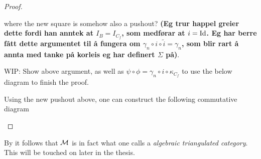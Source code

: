 \begin{proof}
\begin{enumerate}[label={(\bfseries TR\arabic*)}]
{            %

            where the new square is somehow also a pushout? {\bf (Eg trur happel greier dette fordi han anntek at \( I_B = I_{C_f} \), som medførar at \( i = \operatorname{Id} \). Eg har berre fått dette argumentet til å fungera om \( \gamma_n \circ i \circ \tilde{i} = \gamma_n \), som blir rart å annta med tanke på korleis eg har definert \( \Sigma \) på)}.

            WIP: Show above argument, as well as \( \psi \circ \phi = \gamma_n \circ i \circ \kappa_{C_f} \) to use the below diagram to finish the proof.

            Using the new pushout above, one can construct the following commutative diagram
            \begin{center}
            \end{center}
        }
    \end{enumerate}
\end{proof}

By \cite[Lemma, Subsection 7.5]{Krause_2007} it follows that \( {\mathcal{M}} \) is in fact what one calls a \emph{algebraic triangulated category}. This will be touched on later in the thesis. %